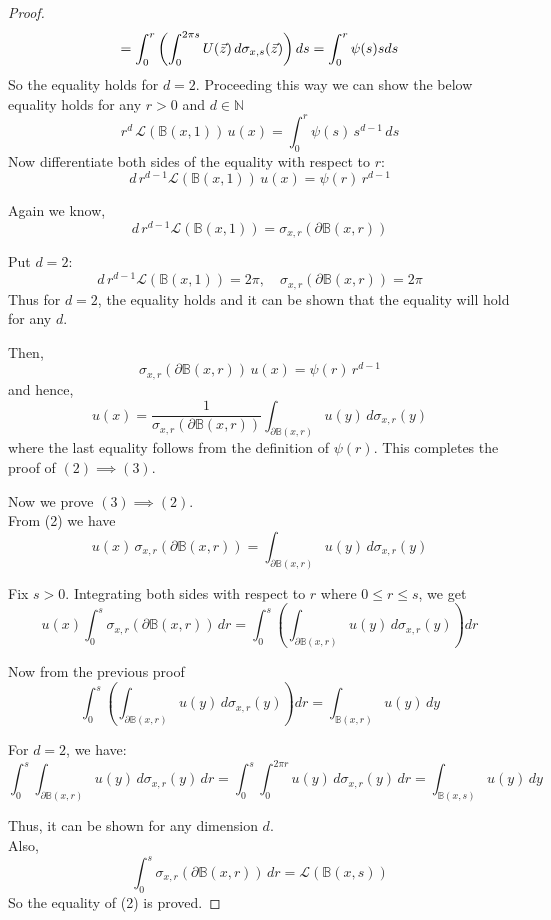 \documentclass[11pt, a4paper, oneside]{report}
\numberwithin{equation}{section}
\begin{document}
\begin{proof}
\[
= \int_0^r \left( \int_0^{2\pi s} U(\vec{z})\,d\sigma_{x,s}(\vec{z}) \right) ds\\
=\int_0^r \psi(s) s ds
\]
\noindent So the equality holds for \(d = 2\).
Proceeding this way we can show the below equality holds for any \(r > 0 \) and \(d \in \mathbb{N}\)
\[
r^d \, \mathscr{L}(\mathbb{B}(x,1)) \, u(x) = \int_0^r \psi(s)\,s^{d-1}\,ds
\]
Now differentiate both sides of the equality with respect to \( r \):
\[
d\, r^{d-1} \mathscr{L}(\mathbb{B}(x,1))\, u(x) = \psi(r)\, r^{d-1}
\]

Again we know,  
\[
d\, r^{d-1} \mathscr{L}(\mathbb{B}(x,1)) = \sigma_{x,r}(\partial \mathbb{B}(x, r))
\]

Put \( d = 2 \):  
\[
d\, r^{d-1} \mathscr{L}(\mathbb{B}(x,1)) = 2\pi,\quad \sigma_{x,r}(\partial \mathbb{B}(x, r)) = 2\pi
\]
\noindent Thus for \( d = 2 \), the equality holds and it can be shown that the equality will hold for any \( d \).

Then,  
\[
\sigma_{x,r}(\partial \mathbb{B}(x, r))\, u(x) = \psi(r)\, r^{d-1}
\]
and hence,
\[
u(x) = \frac{1}{\sigma_{x,r}(\partial \mathbb{B}(x, r))} \int_{\partial \mathbb{B}(x,r)} u(y)\, d\sigma_{x,r}(y)
\]
where the last equality follows from the definition of $\psi(r)$. This completes the proof of \((2) \implies (3)\).


\noindent Now we prove \( (3) \implies (2) \).\\
From (2) we have  
\[
u(x)\, \sigma_{x,r}(\partial \mathbb{B}(x,r)) = \int_{\partial \mathbb{B}(x,r)} u(y)\, d\sigma_{x,r}(y)
\]

Fix \( s > 0 \).  
Integrating both sides with respect to \(r\) where \(0 \leq r \leq s\), we get 
\[
u(x) \int_0^s \sigma_{x,r}(\partial \mathbb{B}(x,r))\, dr = \int_0^s \left( \int_{\partial \mathbb{B}(x,r)} u(y)\, d\sigma_{x,r}(y) \right) dr
\]

Now from the previous proof 
\[
\int_0^s\left(\int_{\partial \mathbb{B}(x,r)}u(y)\, d\sigma_{x,r}(y)\right)dr = \int_{\mathbb{B}(x,r)} u(y)\, dy
\]

For \( d = 2 \), we have:
\[
\int_0^s\int_{\partial \mathbb{B}(x,r)} u(y)\, d\sigma_{x,r}(y)\, dr = \int_0^s \int_0^{2\pi r} u(y)\, d\sigma_{x,r}(y)\, dr = \int_{\mathbb{B}(x,s)}u(y)\, dy
\]

Thus, it can be shown for any dimension \( d \).\\

Also,
\[
\int_0^s \sigma_{x,r}(\partial \mathbb{B}(x,r))\, dr = \mathscr{L}(\mathbb{B}(x,s))
\]
So the equality of (2) is proved.


\end{proof}
\end{document}
